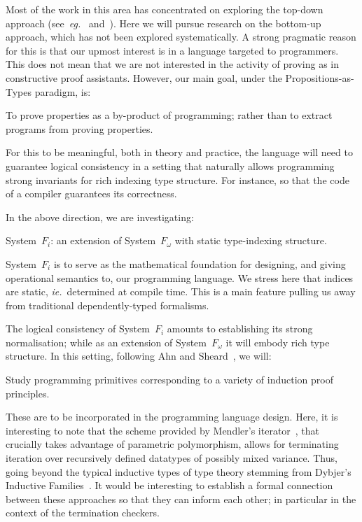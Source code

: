 \documentclass[11pt,twocolumn]{article}
\newcounter{CC}
\newenvironment{resenumerate}
  {\begin{list}{[\textbf{\arabic{CC}]}}
  {\usecounter{CC}
   \setlength{\topsep}{2pt}
   \setlength{\partopsep}{2pt}
   \setlength{\itemsep}{2.5pt}
   \setlength{\parsep}{2.5pt}
   \setlength{\leftmargin}{1.65em}
   \setlength{\labelwidth}{1.15em}
 }}
  {\end{list}}
\newcommand{\eg}{\emph{eg.}}
\newcommand{\ie}{\emph{ie.}}
\newcommand{\SystemFi}{\mbox{System~$F_i$}}
\newcommand{\SystemFomega}{\mbox{System~$F_\omega$}}
\begin{document}
Most of the work in this area has concentrated on exploring the top-down
approach (see~\eg~\cite{Cayenne} and~\cite{Epigram}).  Here we will pursue
research on the bottom-up approach, which has not been explored
systematically.  A strong pragmatic reason for this is that our upmost
interest is in a language targeted to programmers.  This does not mean that we
are not interested in the activity of proving as in constructive proof
assistants.  However, our main goal, under the Propositions-as-Types paradigm,
is: 
\begin{resenumerate}\setcounter{CC}{1}
\item
  To prove properties as a by-product of programming; rather than to extract
  programs from proving properties.
\end{resenumerate}
For this to be meaningful, both in theory and practice, the language will
need to guarantee logical consistency in a setting that naturally allows
programming strong invariants for rich indexing type structure.  For
instance, so that the code of a compiler guarantees its correctness.

In the above direction, we are investigating:
\begin{resenumerate}\setcounter{CC}{2}
\item
  {\SystemFi}: an extension of {\SystemFomega} with static type-indexing
  structure.
\end{resenumerate}
{\SystemFi} is to serve as the mathematical foundation for designing, and
giving operational semantics to, our programming language.  We stress here
that indices are static, \ie~determined at compile time.  This is a main
feature pulling us away from traditional dependently-typed formalisms.

The logical consistency of {\SystemFi} amounts to establishing its strong
normalisation; while as an extension of {\SystemFomega} it will embody
rich type structure.  In this setting, following Ahn and
Sheard~\cite{AhnSheard}, we will:
\begin{resenumerate}\setcounter{CC}{3}
\item
  Study programming primitives corresponding to a variety of induction
  proof principles.
\end{resenumerate}
These are to be incorporated in the programming language design.  Here, it
is interesting to note that the scheme provided by Mendler's
iterator~\cite{MendlerIter}, that crucially takes advantage of
parametric polymorphism, allows for terminating iteration over recursively
defined datatypes of possibly mixed variance.  Thus, going beyond the
typical inductive types of type theory stemming from Dybjer's Inductive
Families~\cite{DybjerIF}.  It would be interesting to establish a formal
connection between these approaches so that they can inform each other;
in particular in the context of the termination checkers. %
\end{document}
